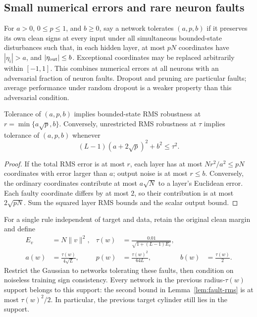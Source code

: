 \subsection{Small numerical errors and rare neuron faults}

For $a>0$, $0\le p\le1$, and $b\ge0$, say a network tolerates $(a,p,b)$ if it preserves its own clean signs at
every input under all simultaneous bounded-state disturbances such that,
in each hidden layer, at most $pN$ coordinates have $|\eta_i|>a$, and
$|\eta_{\rm out}|\le b$. Exceptional coordinates may be replaced
arbitrarily within $[-1,1]$. This combines numerical errors at all neurons
with an adversarial fraction of neuron faults. Dropout and pruning are
particular faults; average performance under random dropout is a weaker
property than this adversarial condition.

\begin{lemma}
\label{lem:fault-rms}
Tolerance of $(a,p,b)$ implies bounded-state RMS robustness at
$r=\min\{a\sqrt p,b\}$. Conversely, unrestricted RMS robustness at $\tau$
implies tolerance of $(a,p,b)$ whenever
\[
 (L-1)(a+2\sqrt p)^2+b^2\le\tau^2.
\]
\end{lemma}
\begin{proof}
If the total RMS error is at most $r$, each layer has at most
$Nr^2/a^2\le pN$ coordinates with error larger than $a$; output noise is
at most $r\le b$. Conversely, the ordinary coordinates contribute at most
$a\sqrt N$ to a layer's Euclidean error. Each faulty coordinate differs
by at most $2$, so their contribution is at most $2\sqrt{pN}$.
Sum the squared layer RMS bounds and the scalar output bound.
\end{proof}

For a single rule independent of target and data, retain the original
clean margin and define
\begin{align*}
 E_v&=N\|v\|^2,&
 \tau(w)&=\frac{0.01}{\sqrt{1+(L-1)E_v}},\\
 a(w)&=\frac{\tau(w)}{4\sqrt L},&
 p(w)&=\frac{\tau(w)^2}{64L},&
 b(w)&=\frac{\tau(w)}2.
\end{align*}
Restrict the Gaussian to networks tolerating these faults, then condition
on noiseless training sign consistency. Every network in the previous
radius-$\tau(w)$ support belongs to this support: the second bound in
Lemma~\ref{lem:fault-rms} is at most $\tau(w)^2/2$.
In particular, the previous target cylinder still lies in the support.

